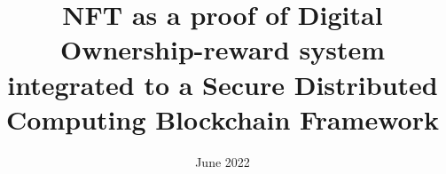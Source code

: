 \documentclass[12pt]{report}
\title{NFT as a proof of Digital Ownership-reward system integrated to a Secure Distributed Computing Blockchain Framework}
\date{June 2022}
\begin{document}
\frontmatter
\pagestyle{empty} 
\declaration





\tableofcontents


\mainmatter





















 






\listoffigures
\listoftables

\appendix

\newpage


 \backmatter
 \label{Bibliography}

\uisbackcover
\end{document}
